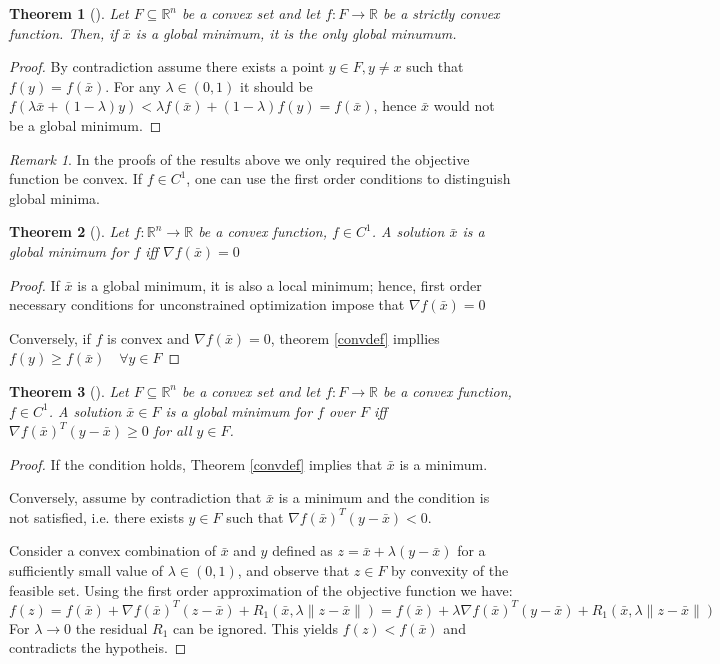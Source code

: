 \documentclass{book}
\newcommand{\R}{\mathbb{R}}
\theoremstyle{theoremv2}
\newtheorem{theorem}{Theorem}[chapter]
\theoremstyle{defv2}
\theoremstyle{remark}
\newtheorem*{remark}{Remark}
\theoremstyle{remark}
\begin{document}
\begin{theorem}[]
    Let $F\subseteq \R^n$ be a convex set and let $f:F\to\R$ be a strictly convex function. Then, if $\bar{x}$ is a global minimum, it is the only global minumum.
\end{theorem}
\begin{proof}
    By contradiction assume there exists a point $y\in F,y\neq x$ such that $f(y)=f(\bar{x})$. For any $\lambda\in(0,1)$ it should be $f\left(\lambda\bar{x}+(1-\lambda)y\right)<\lambda f(\bar{x})+(1-\lambda)f(y) = f(\bar{x})$, hence $\bar{x}$ would not be a global minimum.
\end{proof}
\begin{remark}
    In the proofs of the results above we only required the objective function be convex. If $f\in C^1$, one can use the first order conditions to distinguish global minima.
\end{remark}
\begin{theorem}[]
    Let $f:\R^n\to\R$ be a convex function, $f\in C^1$. A solution $\bar{x}$ is a global minimum for $f$ iff $\nabla f(\bar{x})=0$
\end{theorem}
\begin{proof}
    If $\bar{x}$ is a global minimum, it is also a local minimum; hence, first order necessary conditions for unconstrained optimization impose that $\nabla f(\bar{x})=0$

    Conversely, if $f$ is convex and $\nabla f(\bar{x})=0$, theorem \ref{convdef} impllies $f(y)\geq f(\bar{x})\quad \forall y\in F$
\end{proof}
\begin{theorem}[]
    Let $F\subseteq \R^n$ be a convex set and let $f:F\to\R$ be a convex function, $f\in C^1$. A solution $\bar{x}\in F$ is a global minimum for $f$ over $F$ iff $\nabla f(\bar{x})^T(y-\bar{x})\geq 0$ for all $y\in F$.
\end{theorem}
\begin{proof}
    If the condition holds, Theorem \ref{convdef} implies that $\bar{x}$ is a minimum. 
    
    Conversely, assume by contradiction that $\bar{x}$ is a minimum and the condition is not satisfied, i.e. there exists $y\in F$ such that $\nabla f(\bar{x})^T(y-\bar{x})<0$. 

    Consider a convex combination of $\bar{x}$ and $y$ defined as $z=\bar{x} + \lambda(y-\bar{x})$ for a sufficiently small value of $\lambda\in(0,1)$, and observe that $z\in F$ by convexity of the feasible set. Using the first order approximation of the objective function we have:
    \[
        f(z)=f(\bar{x}) + \nabla f(\bar{x})^T (z-\bar{x})+R_1(\bar{x},\lambda\|z-\bar{x}\|) = f(\bar{x})+\lambda\nabla f(\bar{x})^T(y-\bar{x})+R_1(\bar{x},\lambda\|z-\bar{x}\|)
    \]
    For $\lambda\to 0$ the residual $R_1$ can be ignored. This yields $f(z)<f(\bar{x})$ and contradicts the hypotheis.
\end{proof}
\end{document}
